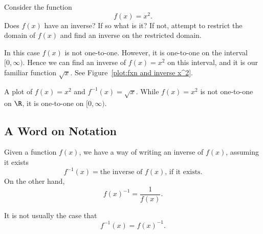 \begin{example}
Consider the function
\[
f(x) = x^2.
\]
Does $f(x)$ have an inverse? If so what is it? If not, attempt to
restrict the domain of $f(x)$ and find an inverse on the restricted
domain.
\end{example}


\begin{solution}
In this case $f(x)$ is not one-to-one. However, it is one-to-one on
the interval $[0,\infty)$. Hence we can find an inverse of $f(x)=x^2$
  on this interval, and it is our familiar function $\sqrt{x}$.  See
  Figure~\ref{plot:fxn and inverse x^2}.
\end{solution}

\begin{marginfigure}[0in]
\caption{A plot of $f(x)=x^2$ and $f^{-1}(x) = \sqrt{x}$. While
  $f(x)=x^2$ is not one-to-one on $\R$, it is one-to-one on
  $[0,\infty)$.}
\label{plot:fxn and inverse x^2}
\end{marginfigure}


\subsection{A Word on Notation}

Given a function $f(x)$, we have a way of writing an inverse of $f(x)$, assuming it exists
\[
f^{-1}(x) = \text{the inverse of $f(x)$, if it exists.}
\]
On the other hand,
\[
f(x)^{-1} = \frac{1}{f(x)}.
\]

\begin{warning}
It is not usually the case that 
\[
f^{-1}(x) = f(x)^{-1}.
\]
\end{warning}

